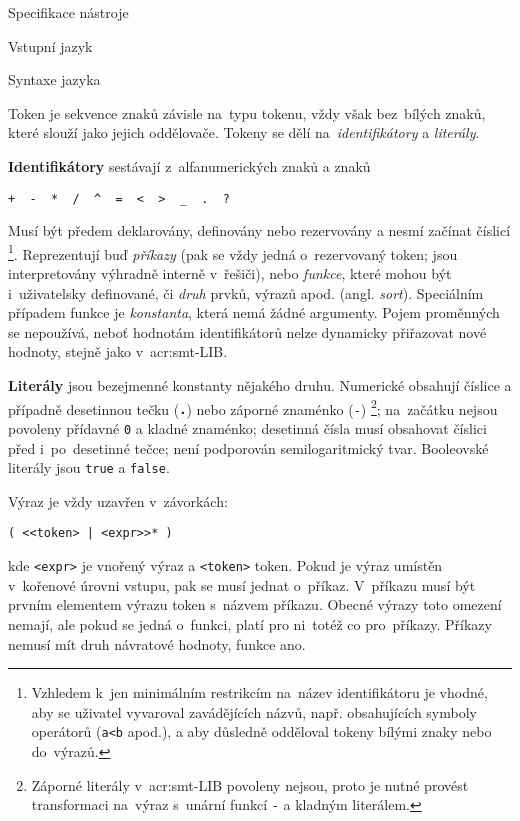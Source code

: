 \documentclass[thesis=M,czech]{FITthesis}[2012/06/26]
\newcommand{\acrlabel}[1]{acr:#1}
\newcommand{\acr}[1]{\acrshort{\acrlabel{#1}}}
\newcommand{\id}[1]{\texttt{#1}}
\newcommand{\hl}[1]{\textit{#1}}
\newcommand{\hll}[1]{\textbf{#1}}
\newcommand{\name}[1]{\hl{#1}}
\begin{document}
\begin{section}{Specifikace nástroje}
\begin{subsection}{Vstupní jazyk}
\begin{subsubsection}{Syntaxe jazyka}

\begin{paragraph}{Token}\label{p:design:spec:ilang:struct:token}
je sekvence znaků závisle na~typu tokenu,
vždy však bez~bílých znaků, které slouží jako jejich oddělovače.
Tokeny se dělí na~\name{identifikátory} a \name{literály}.

\hll{Identifikátory} sestávají z~alfanumerických znaků a znaků
\begin{center}
\id{+ \  - \  * \  / \  \^{} \  = \  < \  > \  \_ \  . \  ?}
\end{center}
Musí být předem deklarovány, definovány nebo rezervovány
a nesmí začínat číslicí%
\footnote{Vzhledem k~jen minimálním restrikcím na~název identifikátoru
je vhodné, aby se uživatel vyvaroval zavádějících názvů,
např. obsahujících symboly operátorů
(\id{a<b} apod.),
a aby důsledně odděloval tokeny bílými znaky
nebo do~výrazů.}.
Reprezentují buď \name{příkazy}
(pak se vždy jedná o~rezervovaný token;
jsou interpretovány výhradně interně v~řešiči),
nebo \name{funkce},
které mohou být i~uživatelsky definované,
či \name{druh} prvků, výrazů apod. (angl. \name{sort}).
Speciálním případem funkce je \name{konstanta},
která nemá žádné argumenty.
Pojem proměnných se nepoužívá,
neboť hodnotám identifikátorů nelze dynamicky přiřazovat nové hodnoty,
stejně jako v~\acr{smt}-LIB.

\hll{Literály} jsou bezejmenné konstanty
nějakého druhu.
Numerické obsahují číslice a případně desetinnou tečku (\id{\hll{.}})
nebo záporné znaménko (\id{-})%
\footnote{Záporné literály v~\acr{smt}-LIB povoleny nejsou,
proto je nutné provést transformaci na~výraz
s~unární funkcí \id{-} a kladným literálem.};
na~začátku nejsou povoleny přídavné \id{0} a kladné znaménko;
desetinná čísla musí obsahovat číslici před i~po~desetinné tečce;
není podporován semilogaritmický tvar.
Booleovské literály jsou \id{true} a \id{false}.
\end{paragraph} %


\begin{paragraph}{Výraz}\label{p:design:spec:ilang:struct:expr}
je vždy uzavřen v~závorkách:
\begin{center}
\id{( <{}<token> | <expr>{}>* )}
\end{center}
kde \id{<expr>} je vnořený výraz
a \id{<token>} token.
Pokud je výraz umístěn v~kořenové úrovni vstupu,
pak se musí jednat o~příkaz.
V~příkazu musí být prvním elementem výrazu
token s~názvem příkazu.
Obecné výrazy toto omezení nemají,
ale pokud se jedná o~funkci,
platí pro ni~totéž co pro~příkazy.
Příkazy nemusí mít druh návratové hodnoty,
funkce ano.


\end{paragraph}
\end{subsubsection}
\end{subsection}
\end{section}
\end{document}
